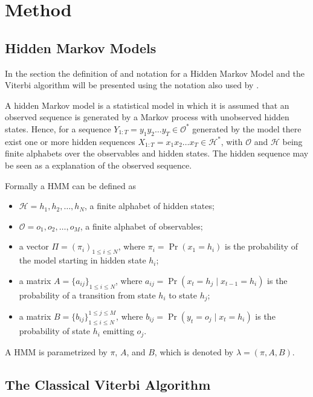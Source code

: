 \chapter{Method}

\section{Hidden Markov Models}

In the section the definition of and notation for a Hidden Markov Model and the
Viterbi algorithm will be presented using the notation also used by
\citet{sand2013ziphmmlib}.

A hidden Markov model is a statistical model in which it is assumed that an
observed sequence is generated by a Markov process with unobserved hidden
states. Hence, for a sequence $Y_{1:T} = y_1y_2\dots{}y_T \in \mathcal{O^*}$
generated by the model there exist one or more hidden sequences
$X_{1:T} = x_1x_2\dots{}x_T \in \mathcal{H^*}$, with $\mathcal{O}$ and
$\mathcal{H}$ being finite alphabets over the observables and hidden
states. The hidden sequence may be seen as a explanation of the observed
sequence.

Formally a HMM can be defined as
\begin{itemize}
\item $\mathcal{H} = {h_1, h_2, \dots, h_N}$, a finite alphabet of hidden
  states;
\item $\mathcal{O} = {o_1, o_2, \dots, o_M}$, a finite alphabet of observables;
\item a vector $\Pi = {(\pi_i)}_{1 \le i \le N}$, where $\pi_i = \Pr(x_1 =
  h_i)$ is the probability of the model starting in hidden state $h_i$;
\item a matrix $A = {\{a_{ij}\}}_{1 \le i \le N}$, where $a_{ij} = \Pr(x_t
  = h_j \mid x_{t - 1} = h_i)$ is the probability of a transition from state
  $h_i$ to state $h_j$;
\item a matrix $B = {\{b_{ij}\}}_{1 \le i \le N}^{1 \le j \le M}$, where
  $b_{ij} = \Pr(y_t = o_j \mid x_t = h_i)$ is the probability of state
  $h_i$ emitting $o_j$.
\end{itemize}

A HMM is parametrized by $\pi$, $A$, and $B$, which is denoted by $\lambda =
(\pi, A, B)$.

\section{The Classical Viterbi Algorithm}
\label{sec:class-viterbi-algor}

